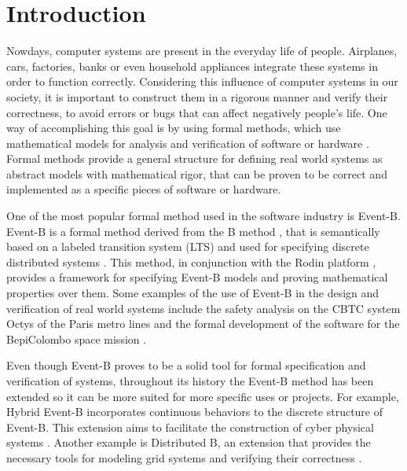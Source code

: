\chapter{Introduction}
Nowdays, computer systems are present in the everyday life of people. Airplanes, cars, factories, banks or even household appliances integrate these systems in order to function correctly. Considering this influence of computer systems in our society, it is important to construct them in a rigorous manner and verify their correctness, to avoid errors or bugs that can affect negatively people's life. One way of accomplishing this goal is by using formal methods, which use mathematical models for analysis and verification of software or hardware \cite{Woodcock2009}. Formal methods provide a general structure for defining real world systems as abstract models with mathematical rigor, that can be proven to be correct and implemented as a specific pieces of software or hardware.   

One of the most popular formal method used in the software industry is Event-B. Event-B is a formal method derived from the B method \cite{Abrial1996}, that is semantically based on a labeled transition system (LTS) \cite{LTS} and used for specifying discrete distributed systems \cite{Abrial2011}. This method, in conjunction with the Rodin platform \cite{Rodin}, provides a framework for specifying Event-B models and proving mathematical properties over them. Some examples of the use of Event-B in the design and verification of real world systems include the safety analysis on the CBTC system Octys of the Paris metro lines \cite{Comptier2017} and the formal development of the software for the BepiColombo space mission \cite{Iliasov2010}. 

Even though Event-B proves to be a solid tool for formal specification and verification of systems, throughout its history the Event-B method has been extended so it can be more suited for more specific uses or projects. For example, Hybrid Event-B incorporates continuous behaviors to the discrete structure of Event-B. This extension aims to facilitate the construction of cyber physical systems \cite{Banach2015}. Another example is Distributed B, an extension that provides the necessary tools for modeling grid systems and verifying their correctness \cite{Grid}.


